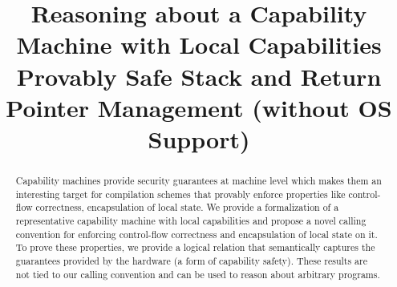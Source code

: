 \documentclass[compsoc,conference,letterpaper,fleqn]{IEEEtran}
\begin{document}
\setlength{\mathindent}{.2cm}

\title{Reasoning about a Capability Machine with Local Capabilities\\
 Provably Safe Stack and Return Pointer Management (without OS Support)}


\author{%
}
\maketitle

\begin{abstract}  
  Capability machines provide security guarantees at machine level which makes
  them an interesting target for compilation schemes that provably enforce
  properties like control-flow correctness, encapsulation of local state. We
  provide a formalization of a representative capability machine with local
  capabilities and propose a novel calling convention for enforcing control-flow
  correctness and encapsulation of local state on it. To prove these properties,
  we provide a logical relation that semantically captures the guarantees
  provided by the hardware (a form of capability safety). These results are not
  tied to our calling convention and can be used to reason about arbitrary
  programs.
\end{abstract}




\end{document}
